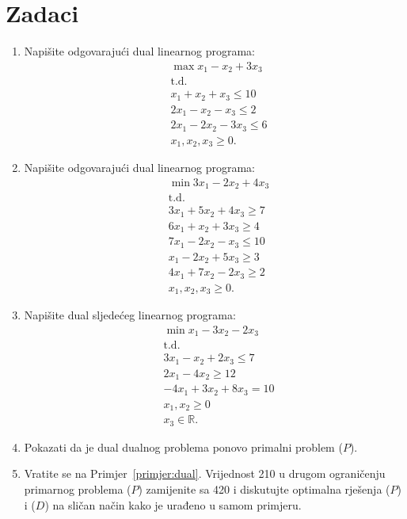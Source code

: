 \documentclass[b5paper, utf8, 11pt, colorlinks]{book}
\theoremstyle{definition}
\begin{document}
\section{Zadaci}
\begin{enumerate}
	\item %
	Napišite odgovarajući dual linearnog programa:
	\begin{align*}
		&\max x_1 - x_2 + 3 x_3 \\
		& \mbox{t.d.} \\
		& x_1 + x_2 + x_3 \leq 10 \\
		& 2x_1 - x_2 - x_3 \leq 2 \\
		& 2x_1 - 2x_2 - 3 x_3 \leq 6 \\
		& x_1, x_2, x_3 \geq 0.
	\end{align*}
	\item    	Napišite odgovarajući dual linearnog programa:
	\begin{align*}
		&\min 3 x_1 - 2 x_2 + 4 x_3 \\
		& \mbox{t.d.} \\
		& 3x_1 + 5 x_2 + 4 x_3 \geq 7 \\
		& 6 x_1 + x_2 + 3 x_3 \geq 4 \\
		& 7 x_1 - 2 x_2 - x_3 \leq 10 \\
		& x_1 - 2 x_2 + 5 x_3 \geq 3 \\
		& 4 x_1 + 7 x_2 - 2 x_3 \geq 2 \\
		& x_1, x_2, x_3 \geq 0.
	\end{align*}
	\item Napišite dual sljedećeg linearnog programa:
	\begin{align*}
		&\min x_1 - 3 x_2 - 2 x_3 \\
		&\mbox{t.d.} \\
		& 3 x_1 - x_2 + 2 x_3 \leq 7 \\
		& 2 x_1 - 4 x_2 \geq 12 \\
		& -4x_1 + 3x_2 + 8 x_3 = 10 \\
		& x_1, x_2\geq 0 \\
		& x_3 \in \mathbb{R}. 
	\end{align*}
	\item %
	Pokazati da je dual dualnog problema ponovo primalni problem ($P$).
	
	\item Vratite se na Primjer~\ref{primjer:dual}. Vrijednost 210 u drugom ograničenju primarnog problema  ($P$)  zamijenite sa 420 i diskutujte optimalna rješenja  ($P$)  i  ($D$)  na sličan način kako je urađeno  u samom primjeru.
	

\end{enumerate}
\end{document}
